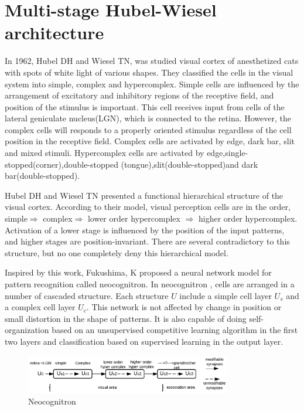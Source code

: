 \documentclass{article}
\begin{document}
\section{Multi-stage Hubel-Wiesel architecture}
In 1962, Hubel DH and Wiesel TN\cite{Hubel1962},\cite{Hubel1965a} was studied visual cortex of anesthetized cats  with   spots of white light of various shapes. They classified the  cells in the visual system into  simple, complex and hypercomplex. Simple cells are influenced  by the arrangement of  excitatory and inhibitory regions of the receptive field, and  position of the stimulus is important. This cell receives input from cells of the lateral geniculate nucleus(LGN), which is connected to the retina. However, the complex cells will responds to  a properly  oriented stimulus regardless of the cell position in the receptive field. Complex cells are activated by edge, dark bar, slit and mixed stimuli. Hypercomplex cells are activated by edge,single-stopped(corner),double-stopped (tongue),slit(double-stopped)and dark bar(double-stopped).

\par Hubel DH and Wiesel TN \cite{Hubel1965a} presented a functional hierarchical structure of the visual cortex. According to their model, visual perception cells are in the  order, simple$\Longrightarrow$ complex$\Longrightarrow$ lower order hypercomplex $\Longrightarrow$ higher  order hypercomplex. Activation of  a lower stage is  influenced by  the position of the input patterns, and  higher stages are  position-invariant. There are several  contradictory to this structure, but no one   completely deny this hierarchical model.
\par Inspired by this work, Fukushima, K \cite{Stark1980} proposed a neural network model for pattern recognition called neocognitron.
In neocognitron , cells are arranged in  a number of  cascaded structure. Each  structure $U$ include a  simple cell layer $U_s$ and a complex cell layer $U_c$. This network is not affected by change in position or small distortion in the shape of patterns.  It is also capable of doing self-organization based on an unsupervised competitive learning algorithm\cite{Fukushima1982} in the first two layers and classification based on  supervised learning in the output layer.
\begin{figure}[ht]
 \centering
 \includegraphics[width=9cm]{Figures/neocognitron.eps}
\caption{Neocognitron\cite{Stark1980}}
\label{neo}
\end{figure}
\end{document}
